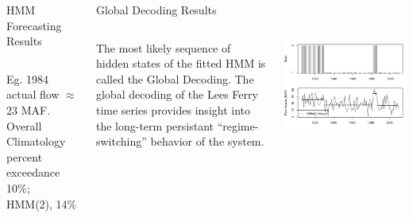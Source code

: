 \documentclass[final,x11names]{beamer}
\begin{document}
\begin{frame}{}
\begin{columns}
\begin{column}{.33\linewidth}
\begin{block}{HMM Forecasting Results}
\begin{columns}
\begin{column}{.38\textwidth}
				  Eg. 1984 actual flow $\approx$23 MAF. Overall Climatology percent exceedance 
				  10\%;  HMM(2), 14\%
				\end{column}
			\end{columns}
		\end{block}
		
      \end{column}
      
      \begin{column}{.33\linewidth}
      
		\begin{block}{Global Decoding Results}
		
			\begin{columns}
				\begin{column}{.38\textwidth}
					The most likely sequence of hidden states of the fitted HMM is called the Global Decoding. The global decoding of the Lees Ferry time series provides insight into the {\color{orange}long-term persistant ``regime-switching''} behavior of the system. 
				\end{column}
				\begin{column}{.58\textwidth}
					\includegraphics[width=\textwidth]{figs/decoding-period-means.pdf}
				\end{column}
			\end{columns}
			
		\end{block}
		

\end{column}
\end{columns}
\end{frame}
\end{document}
